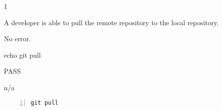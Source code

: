 \begin{description}[align=right,leftmargin=3.2cm,labelindent=3.0cm]
\item[Step:] 1
\item[Confirm:] A developer is able to pull the remote repository to the local repository.
\item[Expectation:] No error.
\item[Command:] echo git  pull
\item[Test Result:] PASS
\item[Evidence:] n/a
\end{description}
\begin{lstlisting}[numbers=left]
git pull

\end{lstlisting}
